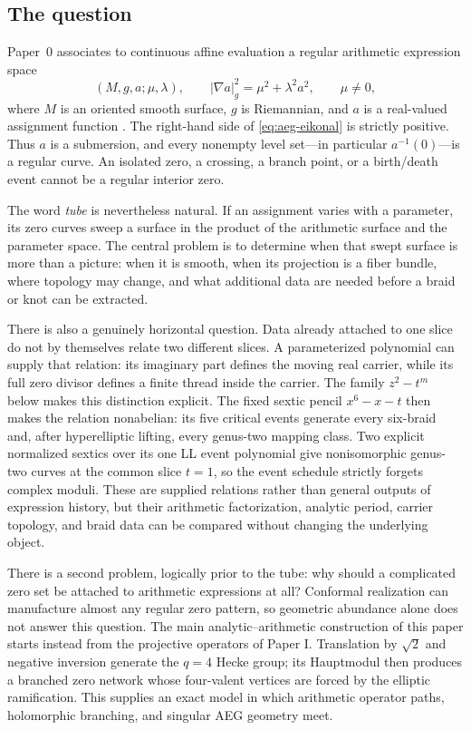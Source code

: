\subsection{The question}

Paper~0 associates to continuous affine evaluation a regular arithmetic expression
space
\[
  (M,g,a;\mu,\lambda),
  \qquad
  |\nabla a|_g^2=\mu^2+\lambda^2a^2,
  \qquad \mu\ne0,
  \tag{AEG}
  \label{eq:aeg-eikonal}
\]
where $M$ is an oriented smooth surface, $g$ is Riemannian, and $a$ is a
real-valued assignment function \cite{Yuan2026AEGPaperZero}.  The right-hand
side of \eqref{eq:aeg-eikonal} is strictly positive.  Thus $a$ is a submersion,
and every nonempty level set---in particular $a^{-1}(0)$---is a regular curve.
An isolated zero, a crossing, a branch point, or a birth/death event cannot be a
regular interior zero.

The word \emph{tube} is nevertheless natural.  If an assignment varies with a
parameter, its zero curves sweep a surface in the product of the arithmetic
surface and the parameter space.  The central problem is to determine when that
swept surface is more than a picture: when it is smooth, when its projection is a
fiber bundle, where topology may change, and what additional data are needed
before a braid or knot can be extracted.

There is also a genuinely horizontal question.  Data already attached to one
slice do not by themselves relate two different slices.  A parameterized
polynomial can supply that relation: its imaginary part defines the moving real
carrier, while its full zero divisor defines a finite thread inside the carrier.
The family $z^2-t^m$ below makes this distinction explicit.  The fixed sextic
pencil $x^6-x-t$ then makes the relation nonabelian: its five critical events
generate every six-braid and, after hyperelliptic lifting, every genus-two
mapping class.  Two explicit normalized sextics over its one LL event
polynomial give nonisomorphic genus-two curves at the common slice $t=1$,
so the event schedule strictly forgets complex moduli.  These are supplied
relations rather than general outputs of
expression history, but their arithmetic factorization, analytic period,
carrier topology, and braid data can be compared without changing the
underlying object.

There is a second problem, logically prior to the tube: why should a complicated
zero set be attached to arithmetic expressions at all?  Conformal realization can
manufacture almost any regular zero pattern, so geometric abundance alone does not
answer this question.  The main analytic--arithmetic construction of this paper
starts instead from the projective operators of Paper I.  Translation by
$\sqrt2$ and negative inversion generate the $q=4$ Hecke group; its Hauptmodul
then produces a branched zero network whose four-valent vertices are forced by the
elliptic ramification.  This supplies an exact model in which arithmetic operator
paths, holomorphic branching, and singular AEG geometry meet.


